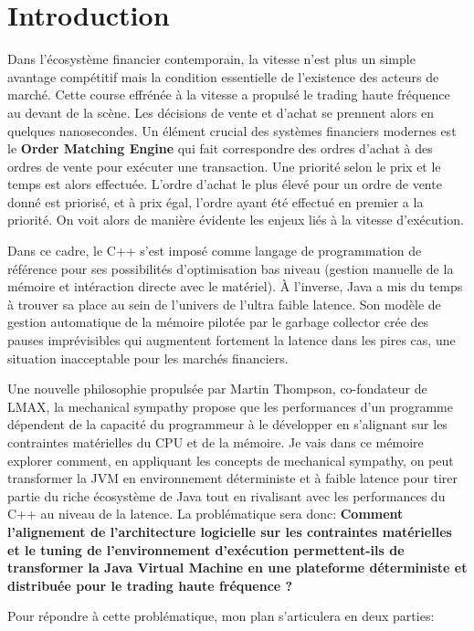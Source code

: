 \section*{Introduction}
Dans l'écosystème financier contemporain, la vitesse n'est plus un simple avantage compétitif mais la condition essentielle de l'existence des acteurs de marché. Cette course effrénée à la vitesse a propulsé le trading haute fréquence au devant de la scène. Les décisions de vente et d'achat se prennent alors en quelques nanosecondes. Un élément crucial des systèmes financiers modernes est le \textbf{Order Matching Engine} qui fait correspondre des ordres d'achat à des ordres de vente pour exécuter une transaction. Une priorité selon le prix et le temps est alors effectuée. L'ordre d'achat le plus élevé pour un ordre de vente donné est priorisé, et à prix égal, l'ordre ayant été effectué en premier a la priorité. On voit alors de manière évidente les enjeux liés à la vitesse d'exécution.

Dans ce cadre, le C++ s'est imposé comme langage de programmation de référence pour ses possibilités d'optimisation bas niveau (gestion manuelle de la mémoire et intéraction directe avec le matériel). À l'inverse, Java a mis du temps à trouver sa place au sein de l'univers de l'ultra faible latence. Son modèle de gestion automatique de la mémoire pilotée par le garbage collector crée des pauses imprévisibles qui augmentent fortement la latence dans les pires cas, une situation inacceptable pour les marchés financiers.

Une nouvelle philosophie propulsée par Martin Thompson, co-fondateur de LMAX, la mechanical sympathy propose que les performances d'un programme dépendent de la capacité du programmeur à le développer en s'alignant sur les contraintes matérielles du CPU et de la mémoire. Je vais dans ce mémoire explorer comment, en appliquant les concepts de mechanical sympathy, on peut transformer la JVM en environnement déterministe et à faible latence pour tirer partie du riche écosystème de Java tout en rivalisant avec les performances du C++ au niveau de la latence. La problématique sera donc: \textbf{Comment l’alignement de l’architecture logicielle sur les contraintes matérielles et le tuning de l’environnement d’exécution permettent-ils de transformer la Java Virtual Machine en une plateforme déterministe et distribuée pour le trading haute fréquence ?}

Pour répondre à cette problématique, mon plan s'articulera en deux parties:

